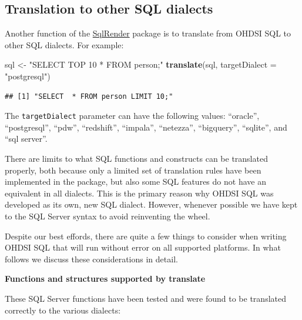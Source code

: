 \documentclass[11pt]{book}
\newenvironment{Shaded}{\begin{snugshade}}{\end{snugshade}}
\newcommand{\DataTypeTok}[1]{\textcolor[rgb]{0.13,0.29,0.53}{#1}}
\newcommand{\KeywordTok}[1]{\textcolor[rgb]{0.13,0.29,0.53}{\textbf{#1}}}
\newcommand{\NormalTok}[1]{#1}
\newcommand{\StringTok}[1]{\textcolor[rgb]{0.31,0.60,0.02}{#1}}
\theoremstyle{definition}
\theoremstyle{definition}
\theoremstyle{definition}
\theoremstyle{remark}
\let\BeginKnitrBlock\begin \let\EndKnitrBlock\end
\begin{document}
\hypertarget{translation-to-other-sql-dialects}{%
\subsection{Translation to other SQL dialects}\label{translation-to-other-sql-dialects}}

Another function of the \href{https://ohdsi.github.io/SqlRender/}{SqlRender} package is to translate from OHDSI SQL to other SQL dialects. For example:

\begin{Shaded}
\begin{Highlighting}[]
\NormalTok{sql <-}\StringTok{ "SELECT TOP 10 * FROM person;"}
\KeywordTok{translate}\NormalTok{(sql, }\DataTypeTok{targetDialect =} \StringTok{"postgresql"}\NormalTok{)}
\end{Highlighting}
\end{Shaded}

\begin{verbatim}
## [1] "SELECT  * FROM person LIMIT 10;"
\end{verbatim}

The \texttt{targetDialect} parameter can have the following values: ``oracle'', ``postgresql'', ``pdw'', ``redshift'', ``impala'', ``netezza'', ``bigquery'', ``sqlite'', and ``sql server''.

\BeginKnitrBlock{rmdimportant}
There are limits to what SQL functions and constructs can be translated properly, both because only a limited set of translation rules have been implemented in the package, but also some SQL features do not have an equivalent in all dialects. This is the primary reason why OHDSI SQL was developed as its own, new SQL dialect. However, whenever possible we have kept to the SQL Server syntax to avoid reinventing the wheel.
\EndKnitrBlock{rmdimportant}

Despite our best effords, there are quite a few things to consider when writing OHDSI SQL that will run without error on all supported platforms. In what follows we discuss these considerations in detail.

\textbf{Functions and structures supported by translate}

These SQL Server functions have been tested and were found to be translated correctly to the various dialects:
\end{document}
